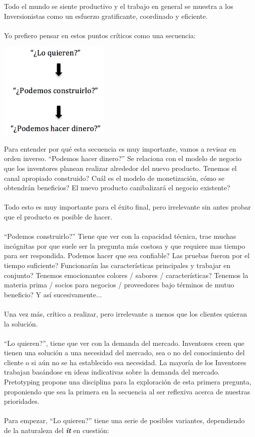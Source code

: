 \documentclass{article}
\begin{document}
Todo el mundo se siente productivo y el trabajo en general se muestra a los Inversionistas como un esfuerzo gratificante, coordinado y eficiente.
\\ \\
Yo prefiero pensar en estos puntos cr\'iticos como una secuencia:
    \begin{center}
    \includegraphics[width=0.4\textwidth]{3_preguntas}
    \end{center}

Para entender por qu\'e esta secuencia es muy importante, vamos a revisar en orden inverso. ``Podemos hacer dinero?'' Se relaciona con el modelo de negocio que los inventores planean realizar alrededor del nuevo producto. Tenemos el canal apropiado construido? Cu\'al es el modelo de monetizaci\'on, c\'omo se obtendr\'an beneficios? El nuevo producto canibalizar\'a el negocio existente?
\\ \\
Todo esto es muy importante para el \'exito final, pero irrelevante sin antes probar que el producto es posible de hacer.
\\ \\
``Podemos construirlo?'' Tiene que ver con la capacidad t\'ecnica, trae muchas inc\'ognitas por que suele ser la pregunta m\'as costosa y que requiere mas tiempo para ser respondida. Podemos hacer que sea confiable? Las pruebas fueron por el tiempo suficiente? Funcionar\'an las caracter\'isticas principales y trabajar en conjunto? Tenemos emocionantes colores / sabores / caracter\'isticas? Tenemos la materia prima / socios para negocios / proveedores bajo t\'erminos de mutuo beneficio? Y as\'i sucesivamente...
\\ \\
Una vez m\'as, cr\'itico a realizar, pero irrelevante a menos que los clientes quieran la soluci\'on.
\\ \\
``Lo quieren?'', tiene que ver con la demanda del mercado. Inventores creen que tienen una soluci\'on a una necesidad del mercado, sea o no del conocimiento del cliente o si a\'un no se ha establecido esa necesidad. La mayor\'ia de los Inventores trabajan bas\'andose en ideas indicativas sobre la demanda del mercado. Pretotyping propone una disciplina para la exploraci\'on de esta primera pregunta, proponiendo que sea la primera en la secuencia al ser reflexiva acerca de nuestras prioridades.
\\ \\
Para empezar, ``Lo quieren?'' tiene una serie de posibles variantes, dependiendo de la naturaleza del \textbf{\textit{it}} en cuesti\'on:
\end{document}

